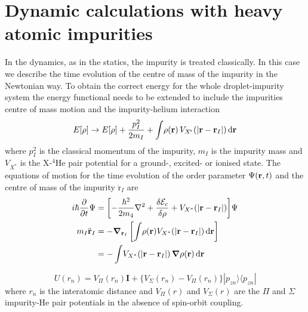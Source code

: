 \documentclass[12pt,a4paper]{book}
\renewcommand{\vec}[1]{\bm{\mathrm{#1}}}
\newcommand{\diff}[1]{\,\mathrm{d}{\vec{#1}}}
\begin{document}
		\clearpage
		\section{Dynamic calculations with heavy atomic impurities}
			In the dynamics, as in the statics, the impurity is treated classically. In this case we describe  the time evolution of the centre of mass of the impurity in the Newtonian way. To obtain the correct energy for the whole droplet-impurity system the energy functional needs to be extended to include the impurities centre of mass motion and the impurity-helium interaction
			\begin{align}
				E[\rho] \rightarrow E[\rho] + \frac{p^2_I}{2 m_I} + \int \! \rho(\mathbf{r}) \, V_{X^{\!*}}\qty(\abs{\vec{r}-\vec{r}_I})\diff{r} \label{eq33}
			\end{align}
			where $p^2_I$ is the classical momentum of the impurity, $m_I$ is the impurity mass and $V_{X^{\!*}}$ is the X-$^4$He pair potential for a ground-, excited- or ionised state. The equations of motion for the time evolution of the order parameter $\Psi\qty(\vec{r},t)$ and the centre of mass of the impurity $\ddot{\vec{r}}_I$ are  
			\begin{align}
				i\hbar\frac{\partial}{\partial t} \Psi &= \qty[-\frac{\hbar^2}{2m_4} \laplacian +\frac{\delta {\cal E}_c}{\delta \rho} + V_{X^*}(|\mathbf{r}- \mathbf{r}_I|)]\Psi\nonumber\\
				m_I \ddot{\mathbf{r}}_I &=
				- \grad_{\vec{r}_I}
				\left[  \int \!\rho(\mathbf{r}) V_{X^*}(|\mathbf{r}- \mathbf{r}_I|)\diff{r}  \right] \\
				 &= -\int \! V_{X^*}(|\mathbf{r}- \mathbf{r}_I|)  \, \grad \rho(\mathbf{r})\diff{r} \label{eq34}
			\end{align}
			
			\begin{equation}
			U(r_n)= 
			V_{\Pi}(r_n)\mathbf{I}+\{V_{\Sigma}(r_n)-V_{\Pi}(r_n)\}|p_{zn}\rangle\langle p_{zn} |  
			\label{eq37}
			\end{equation}
			where $r_n$ is the interatomic distance and $V_\Pi(r)$ and $V_\Sigma(r)$ are the $\Pi$ and $\Sigma$ impurity-He pair potentials in the absence of spin-orbit coupling.
			
\end{document}
